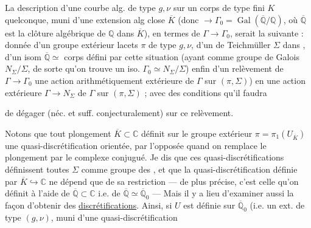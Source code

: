 La description d'une  courbe alg. de type $g,\nu$ sur un corps  de type fini  $K$ quelconque, muni d'une extension alg close $\overline K$ (donc  $\longrightarrow\Gamma_0=\operatorname{Gal}(\overline{\mathbb Q}/\mathbb Q)$, où $\overline{\mathbb Q}$ est la clôture algébrique de $\mathbb Q$ dans $\overline K$), en termes de $\Gamma\longrightarrow\Gamma_0$, serait la suivante : donnée d'un groupe extérieur  lacets $\pi$ de type $g,\nu$, d'un  de Teichmüller $\Sigma$ dans , d'un isom $\overline{\mathbb Q}\simeq$ corps défini par cette situation (ayant comme groupe de Galois  $N_\Sigma/\Sigma$, de sorte qu'on trouve un iso. $\Gamma_0\simeq N_\Sigma/\Sigma$) enfin d'un relèvement de $\Gamma\longrightarrow\Gamma_0$   une action arithmétiquement extérieure de $\Gamma$ sur $(\pi,\Sigma)$) en une action extérieure $\Gamma\longrightarrow N_\Sigma$ de $\Gamma$ sur $(\pi,\Sigma)$ ; avec des conditions qu'il faudra 

de dégager (néc. et suff. conjecturalement) sur ce relèvement.

Notons que tout plongement $\overline K\subset\mathbb C$
définit  sur le groupe extérieur
$\pi=\pi_1(U_{\overline K})$
une quasi-discrétification orientée, 
par l'opposée quand on remplace le plongement par le complexe conjugué.
  Je dis que ces
quasi-discrétifications définissent toutes $\Sigma$ comme groupe des
, et que la quasi-discrétification
définie par $\overline K\hookrightarrow\mathbb C$ ne dépend que de
sa restriction 
--- de  plus précise, c'est celle qu'on définit
 à l'aide de $\overline{\mathbb Q}\subset\mathbb C$ i.e. de
$\overline{\mathbb Q}\simeq\overline{\mathbb Q}_0$
--- Mais il y a lieu d'examiner aussi la façon d'obtenir des
\uline{discrétifications}. Ainsi, si  $U$ est définie
sur $\overline{\mathbb Q}_0$ (i.e. un \unsure{$\pi$|$\Pi$} ext. de type
$(g,\nu)$, muni d'une quasi-discrétification

